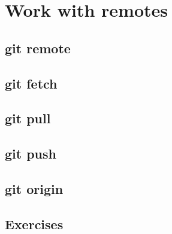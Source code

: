 \section{Work with remotes}
\begin{frame}[fragile]
    \slidetitle
\end{frame}

\subsection{git remote}
\begin{frame}[fragile]
    \subslidetitle
\end{frame}

\subsection{git fetch}
\begin{frame}[fragile]
    \subslidetitle
\end{frame}

\subsection{git pull}
\begin{frame}[fragile]
    \subslidetitle
\end{frame}

\subsection{git push}
\begin{frame}[fragile]
    \subslidetitle
\end{frame}

\subsection{git origin}
\begin{frame}[fragile]
    \subslidetitle
\end{frame}

\subsection{Exercises}
\begin{frame}[fragile]
  \subslidetitle
\end{frame}
